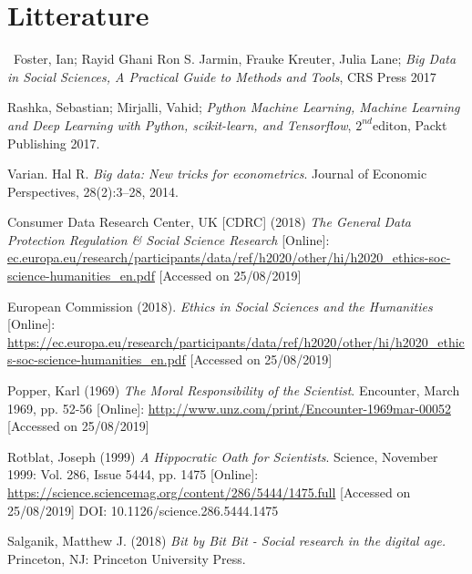 \documentclass[12pt,a4paper]{article}
\begin{document}
\newpage
\section{Litterature}
\ Foster, Ian; Rayid Ghani Ron S. Jarmin, Frauke Kreuter, Julia Lane; \textit{Big Data in Social Sciences, A Practical Guide to Methods and Tools}, CRS Press 2017 \newline

Rashka, Sebastian; Mirjalli, Vahid; \textit{Python Machine Learning, Machine Learning and Deep Learning with Python, scikit-learn, and Tensorflow}, $2^{nd}$editon, Packt Publishing 2017. \newline

Varian. Hal R. \textit{Big data: New tricks for econometrics}. Journal of Economic Perspectives, 28(2):3–28, 2014. \newline

Consumer Data Research Center, UK  [CDRC] (2018) \textit{The General Data Protection Regulation \& Social Science Research} [Online]: \href{https://ec.europa.eu/research/participants/data/ref/h2020/other/hi/h2020_ethics-soc-science-humanities_en.pdf}{ec.europa.eu/research/participants/data/ref/h2020/other/hi/h2020\_ethics-soc-science-humanities\_en.pdf} [Accessed on 25/08/2019]\newline

European Commission (2018). \textit{Ethics in Social Sciences and the Humanities} [Online]: \href{https://ec.europa.eu/research/participants/data/ref/h2020/other/hi/h2020_ethics-soc-science-humanities_en.pdf}{https://ec.europa.eu/research/participants/data/ref/h2020/other/hi/h2020\_ethics-soc-science-humanities\_en.pdf} [Accessed on 25/08/2019] \newline

Popper, Karl (1969) \textit{The Moral Responsibility of the Scientist}. Encounter, March 1969, pp. 52-56 [Online]: \href{http://www.unz.com/print/Encounter-1969mar-00052}{http://www.unz.com/print/Encounter-1969mar-00052} [Accessed on 25/08/2019]\newline

Rotblat, Joseph (1999) \textit{A Hippocratic Oath for Scientists}. Science, November 1999: Vol. 286, Issue 5444, pp. 1475 [Online]: \href{https://science.sciencemag.org/content/286/5444/1475.full}{https://science.sciencemag.org/content/286/5444/1475.full} [Accessed on 25/08/2019] DOI: 10.1126/science.286.5444.1475 \newline
 
Salganik, Matthew J. (2018) \textit{Bit by Bit Bit - Social research in the digital age.} Princeton, NJ: Princeton University Press.\newline
\end{document}
